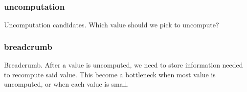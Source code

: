 \subsubsection{uncomputation}
Uncomputation candidates. Which value should we pick to uncompute?
\subsubsection{breadcrumb}
Breadcrumb. After a value is uncomputed, we need to store information needed to recompute said value. This become a bottleneck when most value is uncomputed, or when each value is small.
